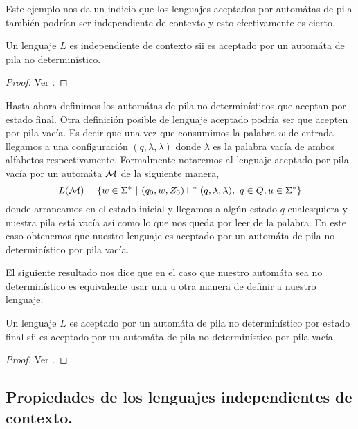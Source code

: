 \documentclass[tesis.tex]{subfiles}
\newcommand{\ic}{independiente de contexto }
\begin{document}
Este ejemplo nos da un indicio que los lenguajes aceptados por automátas de pila también podrían ser \ic y esto efectivamente es cierto.

\medskip

\begin{teo}
Un lenguaje $L$ es independiente de contexto sii es aceptado por un automáta de pila no determinístico.
\end{teo}

\begin{proof}
	Ver \cite{hopcraft-ullman}.
\end{proof}
 


Hasta ahora definimos los automátas de pila no determinísticos que aceptan por estado final. Otra definición posible de lenguaje aceptado podría ser que acepten por pila vacía. 
Es decir que una vez que consumimos la palabra $w$ de entrada llegamos a una configuración $(q, \lambda, \lambda)$ donde $\lambda$ es la palabra vacía de ambos alfabetos respectivamente. Formalmente notaremos al lenguaje aceptado por pila vacía por un automáta $\cal M$
de la siguiente manera,
\begin{equation*}
	L({\cal M}) = \{ w \in \Sigma^* \ | \ (q_0,w,Z_0) \vdash^* (q, \lambda, \lambda), \ q \in Q, u \in \Sigma^*    \}
\end{equation*}
donde arrancamos en el estado inicial y llegamos a algún estado $q$ cualesquiera y nuestra pila está vacía así como lo que nos queda por leer de la palabra. 
En este caso obtenemos que nuestro lenguaje es aceptado por un automáta de pila no determinístico por pila vacía.


El siguiente resultado nos dice que en el caso que nuestro automáta sea no determinístico es equivalente usar una u otra manera de definir a nuestro lenguaje.

\medskip
\begin{teo}
Un lenguaje $L$ es aceptado por un automáta de pila no determinístico por estado final sii es aceptado por un automáta de pila no determinístico por pila vacía.
\end{teo}

\begin{proof}
	Ver \cite{hopcraft-ullman}.
\end{proof}


\subsection{Propiedades de los lenguajes independientes de contexto.}
\end{document}
